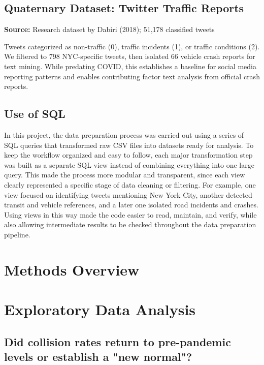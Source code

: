 \documentclass[10pt]{article}\usepackage[]{graphicx}\usepackage[]{xcolor}
\begin{document}
\subsection{Quaternary Dataset: Twitter Traffic Reports}
\textbf{Source:} Research dataset by Dabiri (2018); 51,178 classified tweets

Tweets categorized as non-traffic (0), traffic incidents (1), or traffic conditions (2). We filtered to 798 NYC-specific tweets, then isolated 66 vehicle crash reports for text mining. While predating COVID, this establishes a baseline for social media reporting patterns and enables contributing factor text analysis from official crash reports.

\subsection{Use of SQL}

In this project, the data preparation process was carried out using a series of SQL queries that transformed raw CSV files into datasets ready for analysis. To keep the workflow organized and easy to follow, each major transformation step was built as a separate SQL view instead of combining everything into one large query. This made the process more modular and transparent, since each view clearly represented a specific stage of data cleaning or filtering. For example, one view focused on identifying tweets mentioning New York City, another detected transit and vehicle references, and a later one isolated road incidents and crashes. Using views in this way made the code easier to read, maintain, and verify, while also allowing intermediate results to be checked throughout the data preparation pipeline.


\newpage












\section{Methods Overview}

\section{Exploratory Data Analysis}

\subsection{Did collision rates return to pre-pandemic levels or establish a "new normal"?}
\end{document}
